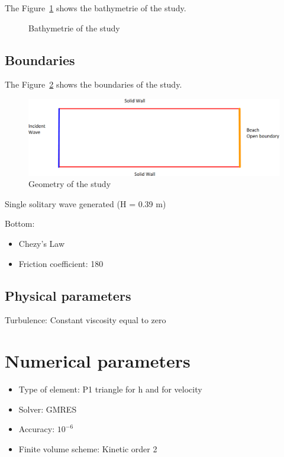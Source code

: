 The Figure~\ref{fig:triang:bathy} shows the bathymetrie of the study.
\begin{figure}
\centering
{}
\caption{Bathymetrie of the study}\label{fig:triang:bathy}
\end{figure}


\subsection{Boundaries}

The Figure~\ref{fig:triang:boundaries} shows the boundaries of the study.
\begin{figure}
\centering
\includegraphics[width=.6\textwidth]{img/boundaries.png}
\caption{Geometry of the study}\label{fig:triang:boundaries}
\end{figure}

Single solitary wave generated (H = 0.39 m)

Bottom:
\begin{itemize}
  \item Chezy's Law
  \item Friction coefficient: 180
\end{itemize}

\subsection{Physical parameters}

Turbulence: Constant viscosity equal to zero

\section{Numerical parameters}

\begin{itemize}
  \item Type of element: P1 triangle for h and for velocity
  \item Solver: GMRES
  \item Accuracy: $10^{-6}$
  \item Finite volume scheme: Kinetic order 2
\end{itemize}


